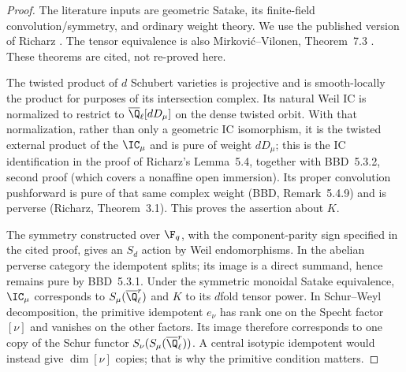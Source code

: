 \begin{proof}
The literature inputs are geometric Satake, its finite-field convolution/symmetry, and ordinary weight theory. We use the published version of Richarz \cite[Theorem~3.1, p.~214; proof pp.~226--227; Proposition~4.1, p.~227; Theorem~5.1, p.~230; Lemma~5.4 and its proof, p.~232]{Richarz}. The tensor equivalence is also Mirkovi\'c--Vilonen, Theorem~7.3 \cite{MV}. These theorems are cited, not re-proved here.

The twisted product of $d$ Schubert varieties is projective and is smooth-locally the product for purposes of its intersection complex. Its natural Weil IC is normalized to restrict to $\overline\Q_\ell[dD_\mu]$ on the dense twisted orbit. With that normalization, rather than only a geometric IC isomorphism, it is the twisted external product of the $\IC_\mu$ and is pure of weight $dD_\mu$; this is the IC identification in the proof of Richarz's Lemma~5.4, together with BBD~5.3.2, second proof (which covers a nonaffine open immersion). Its proper convolution pushforward is pure of that same complex weight (BBD, Remark~5.4.9) and is perverse (Richarz, Theorem~3.1). This proves the assertion about $K$.

The symmetry constructed over $\F_q$, with the component-parity sign specified in the cited proof, gives an $S_d$ action by Weil endomorphisms. In the abelian perverse category the idempotent splits; its image is a direct summand, hence remains pure by BBD~5.3.1. Under the symmetric monoidal Satake equivalence, $\IC_\mu$ corresponds to $S_\mu(\overline\Q_\ell^r)$ and $K$ to its $d$fold tensor power. In Schur--Weyl decomposition, the primitive idempotent $e_\nu$ has rank one on the Specht factor $[\nu]$ and vanishes on the other factors. Its image therefore corresponds to one copy of the Schur functor $S_\nu(S_\mu(\overline\Q_\ell^r))$. A central isotypic idempotent would instead give $\dim[\nu]$ copies; that is why the primitive condition matters.


\end{proof}
